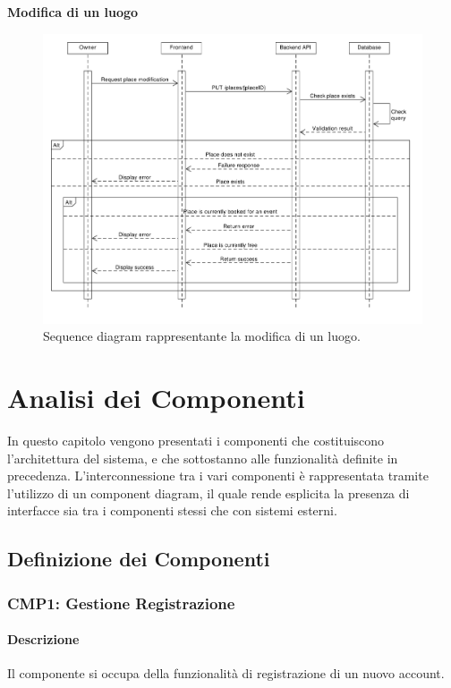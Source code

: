 \documentclass[9pt]{extarticle}
\begin{document}
\newpage


\textbf{Modifica di un luogo}
\begin{figure}[!htb]
	\centering
	\includegraphics[width=\linewidth]{./images/SequenceDiagramEditPlace.pdf}
	\caption{Sequence diagram rappresentante la modifica di un luogo.}
	\label{fig:SeqDiagEditPlace}
\end{figure}


\newpage
\section{Analisi dei Componenti}

In questo capitolo vengono presentati i componenti che costituiscono l'architettura del sistema, e che sottostanno alle funzionalità definite in precedenza. L'interconnessione tra i vari componenti è rappresentata tramite l'utilizzo di un component diagram, il quale rende esplicita la presenza di interfacce sia tra i componenti  stessi che con sistemi esterni.

\subsection{Definizione dei Componenti}

\subsubsection*{CMP1: Gestione Registrazione}
\paragraph{Descrizione}
Il componente si occupa della funzionalità di registrazione di un nuovo account.
\end{document}
